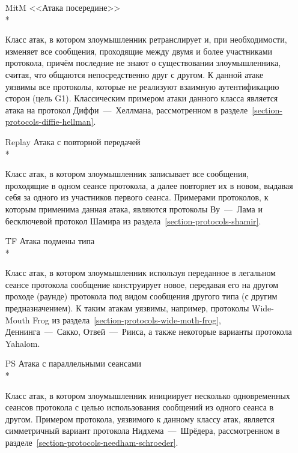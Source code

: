 \begin{itemize}
    \item[MitM] <<Атака посередине>>\\*
    \item[{}] Класс атак, в котором злоумышленник ретранслирует и, при необходимости, изменяет все сообщения, проходящие между двумя и более участниками протокола, причём последние не знают о существовании злоумышленника, считая, что общаются непосредственно друг с другом. К данной атаке уязвимы все протоколы, которые не реализуют взаимную аутентификацию сторон (цель G1). Классическим примером атаки данного класса является атака на протокол Диффи~---~Хеллмана, рассмотренном в разделе~\ref{section-protocols-diffie-hellman}.

    \item[Replay] Атака с повторной передачей\\*
    \item[{}] Класс атак, в котором злоумышленник записывает все сообщения, проходящие в одном сеансе протокола, а далее повторяет их в новом, выдавая себя за одного из участников первого сеанса. Примерами протоколов, к которым применима данная атака, являются протоколы Ву~---~Лама и бесключевой протокол Шамира из раздела~\ref{section-protocols-shamir}.

    \item[TF] Атака подмены типа\\*
    \item[{}] Класс атак, в котором злоумышленник используя переданное в легальном сеансе протокола сообщение конструирует новое, передавая его на другом проходе (раунде) протокола под видом сообщения другого типа (с другим предназначением). К таким атакам уязвимы, например, протоколы Wide-Mouth Frog из раздела~\ref{section-protocols-wide-moth-frog}, Деннинга~---~Сакко, Отвей~---~Рииса, а также некоторые варианты протокола Yahalom.

    \item[PS] Атака с параллельными сеансами\\*
    \item[{}] Класс атак, в котором злоумышленник инициирует несколько одновременных сеансов протокола с целью использования сообщений из одного сеанса в другом. Примером протокола, уязвимого к данному классу атак, является симметричный вариант протокола Нидхема~---~Шрёдера, рассмотренном в разделе~\ref{section-protocols-needham-schroeder}.


\end{itemize}
